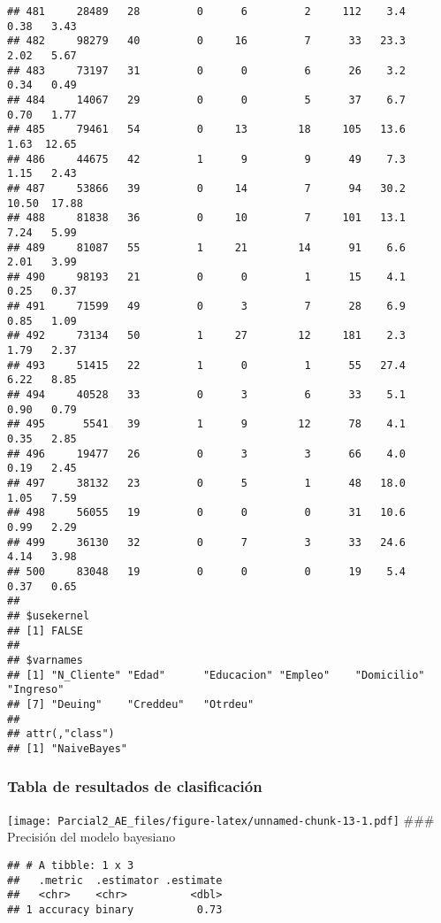 \documentclass[
]{article}
\begin{document}
\begin{verbatim}
## 481     28489   28         0      6         2     112    3.4    0.38   3.43
## 482     98279   40         0     16         7      33   23.3    2.02   5.67
## 483     73197   31         0      0         6      26    3.2    0.34   0.49
## 484     14067   29         0      0         5      37    6.7    0.70   1.77
## 485     79461   54         0     13        18     105   13.6    1.63  12.65
## 486     44675   42         1      9         9      49    7.3    1.15   2.43
## 487     53866   39         0     14         7      94   30.2   10.50  17.88
## 488     81838   36         0     10         7     101   13.1    7.24   5.99
## 489     81087   55         1     21        14      91    6.6    2.01   3.99
## 490     98193   21         0      0         1      15    4.1    0.25   0.37
## 491     71599   49         0      3         7      28    6.9    0.85   1.09
## 492     73134   50         1     27        12     181    2.3    1.79   2.37
## 493     51415   22         1      0         1      55   27.4    6.22   8.85
## 494     40528   33         0      3         6      33    5.1    0.90   0.79
## 495      5541   39         1      9        12      78    4.1    0.35   2.85
## 496     19477   26         0      3         3      66    4.0    0.19   2.45
## 497     38132   23         0      5         1      48   18.0    1.05   7.59
## 498     56055   19         0      0         0      31   10.6    0.99   2.29
## 499     36130   32         0      7         3      33   24.6    4.14   3.98
## 500     83048   19         0      0         0      19    5.4    0.37   0.65
## 
## $usekernel
## [1] FALSE
## 
## $varnames
## [1] "N_Cliente" "Edad"      "Educacion" "Empleo"    "Domicilio" "Ingreso"  
## [7] "Deuing"    "Creddeu"   "Otrdeu"   
## 
## attr(,"class")
## [1] "NaiveBayes"
\end{verbatim}

\hypertarget{tabla-de-resultados-de-clasificaciuxf3n}{%
\subsubsection{Tabla de resultados de
clasificación}\label{tabla-de-resultados-de-clasificaciuxf3n}}

\texttt{[image: Parcial2\_AE\_files/figure-latex/unnamed-chunk-13-1.pdf]}
\#\#\# Precisión del modelo bayesiano

\begin{verbatim}
## # A tibble: 1 x 3
##   .metric  .estimator .estimate
##   <chr>    <chr>          <dbl>
## 1 accuracy binary          0.73
\end{verbatim}
\end{document}
